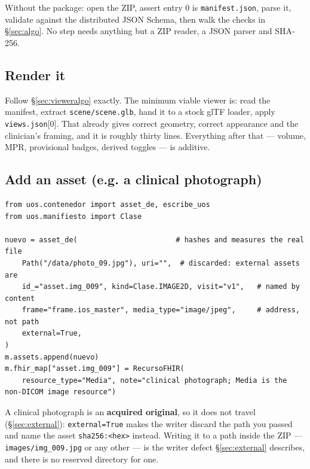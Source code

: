 \documentclass[11pt,a4paper]{article}
\newcommand{\code}[1]{\texttt{\small #1}}
\begin{document}
Without the package: open the ZIP, assert entry 0 is \code{manifest.json}, parse it,
validate against the distributed JSON Schema, then walk the checks in \S\ref{sec:algo}. No
step needs anything but a ZIP reader, a JSON parser and SHA-256.

\subsection{Render it}\label{rec:render}

Follow \S\ref{sec:vieweralgo} exactly. The minimum viable viewer is: read the manifest,
extract \code{scene/scene.glb}, hand it to a stock glTF loader, apply
\code{views.json}[0]. That already gives correct geometry, correct appearance and the
clinician's framing, and it is roughly thirty lines. Everything after that --- volume, MPR,
provisional badges, derived toggles --- is additive.

\subsection{Add an asset (e.g. a clinical photograph)}\label{rec:add}

\begin{lstlisting}[style=py]
from uos.contenedor import asset_de, escribe_uos
from uos.manifiesto import Clase

nuevo = asset_de(                       # hashes and measures the real file
    Path("/data/photo_09.jpg"), uri="",  # discarded: external assets are
    id_="asset.img_009", kind=Clase.IMAGE2D, visit="v1",   # named by content
    frame="frame.ios_master", media_type="image/jpeg",     # address, not path
    external=True,
)
m.assets.append(nuevo)
m.fhir_map["asset.img_009"] = RecursoFHIR(
    resource_type="Media", note="clinical photograph; Media is the non-DICOM image resource")
\end{lstlisting}

A clinical photograph is an \textbf{acquired original}, so it does not travel
(\S\ref{sec:external}): \code{external=True} makes the writer discard the path
you passed and name the asset \code{sha256:<hex>} instead. Writing it to a path
inside the ZIP --- \code{images/img\_009.jpg} or any other --- is the writer defect
\S\ref{sec:external} describes, and there is no reserved directory for one.
\end{document}
